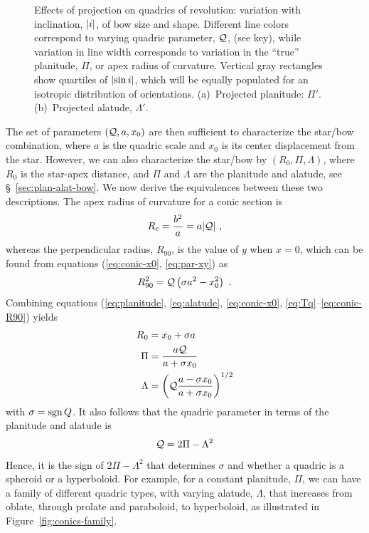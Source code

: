 \begin{figure}
\begin{tabular}{@{}ll@{}}
  \end{tabular}
  \caption[]{Effects of projection on quadrics of revolution:
    variation with inclination, \(\lvert i\rvert\), of bow size and shape.
    Different line colors correspond to varying quadric parameter,
    \(\mathcal{Q}\), (see key), while variation in line width corresponds to
    variation in the ``true'' planitude, \(\Pi\), or apex radius of
    curvature. Vertical gray rectangles show quartiles of
    \(\lvert\sin i\rvert\), which will be equally populated for an isotropic
    distribution of orientations. (a)~Projected planitude:
    \(\Pi'\). (b)~Projected alatude, \(\Lambda'\).}
  \label{fig:quadric-projection}
\end{figure}

The set of parameters \((\mathcal{Q}, a, x_0)\) are then sufficient to
characterize the star/bow combination, where \(a\) is the quadric
scale and \(x_0\) is its center displacement from the star.  However,
we can also characterize the star/bow by \((R_0, \Pi, \Lambda)\), where
\(R_0\) is the star-apex distance, and \(\Pi\) and \(\Lambda\) are the
planitude and alatude, see \S~\ref{sec:plan-alat-bow}.  We now derive
the equivalences between these two descriptions.  The apex radius of
curvature for a conic section is
\begin{equation}
  \label{eq:Rc-conic}
  R_c = \frac{b^2}{a} = a \lvert\mathcal{Q}\rvert\ ,
\end{equation}
whereas the perpendicular radius, \(R_{90}\), is the value of \(y\)
when \(x = 0\), which can be found from equations (\ref{eq:conic-x0},
\ref{eq:par-xy}) as
\begin{equation}
  \label{eq:conic-R90}
  R_{90}^2 = \mathcal{Q} \left(\sigma a^2 - x_0^2\right) \ .
\end{equation}
Combining equations (\ref{eq:planitude}, \ref{eq:alatude},
\ref{eq:conic-x0}, \ref{eq:Tq}--\ref{eq:conic-R90}) yields
\begin{align}
  \label{eq:R0-from-Q-a-x0}
  R_0 &= x_0 + \sigma a  \\
  \label{eq:Pi-from-Q-a-x0}
  \Pi &= \frac{a \mathcal{Q}}{a + \sigma x_0} \\
  \label{eq:Lambda-from-Q-a-x0}
  \Lambda &= \left( \mathcal{Q} \frac{a - \sigma x_0} {a + \sigma x_0}  \right)^{1/2}
\end{align}
with \(\sigma = \operatorname{sgn} Q\).  It also follows that the quadric parameter in
terms of the planitude and alatude is
\begin{equation}
  \label{eq:Tq-from-Pi-Lambda}
  \mathcal{Q} = 2 \Pi - \Lambda^2 
\end{equation}
Hence, it is the sign of \(2 \Pi - \Lambda^2\) that determines
\(\sigma\) and whether a quadric is a spheroid or a hyperboloid.  For
example, for a constant planitude, \(\Pi\), we can have a family of
different quadric types, with varying alatude, \(\Lambda\), that increases
from oblate, through prolate and paraboloid, to hyperboloid, as
illustrated in Figure~\ref{fig:conics-family}.

